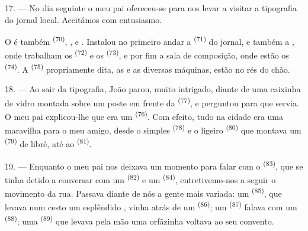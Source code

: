 \VUsaut{3.0mm}

17. --- No dia seguinte o meu pai ofereceu-se para nos levar a visitar a
tipografia do jornal local. Aceitámos com entusiasmo.

O  é também  \textsuperscript{(70)},
,  e . Instalou no
primeiro andar a  \textsuperscript{(71)} do jornal, e também a
, onde trabalham os 
\textsuperscript{(72)} e os  \textsuperscript{(73)}, e por fim
a sala de composição, onde estão os  \textsuperscript{(74)}. A
 \textsuperscript{(75)} propriamente dita, as
 e as diversas máquinas, estão no rés do chão.

\VUsaut{3.0mm}

18. --- Ao sair da tipografia, João parou, muito intrigado, diante de uma
caixinha de vidro montada sobre um poste em frente da 
\textsuperscript{(77)}, e perguntou para que servia. O meu pai explicou-lhe que
era um  \textsuperscript{(76)}. Com efeito, tudo na
cidade era uma maravilha para o meu amigo, desde o simples
 \textsuperscript{(78)} e o ligeiro 
\textsuperscript{(80)} que montava um  \textsuperscript{(79)} de libré,
até ao  \textsuperscript{(81)}.

19. --- Enquanto o meu pai nos deixava um momento para falar com o
 \textsuperscript{(83)}, que se tinha detido a
conversar com um  \textsuperscript{(82)} e um 
\textsuperscript{(84)}, entretivemo-nos a seguir o movimento da rua. Passava
diante de nós a gente mais variada: um 
\textsuperscript{(85)}, que levava num cesto um esplêndido , vinha
atrás de um  \textsuperscript{(86)}; um  \textsuperscript{(87)} falava com um 
\textsuperscript{(88)}; uma  \textsuperscript{(89)} que levava pela mão uma
orfãzinha voltava ao seu convento.

\VUsaut{3.0mm}

